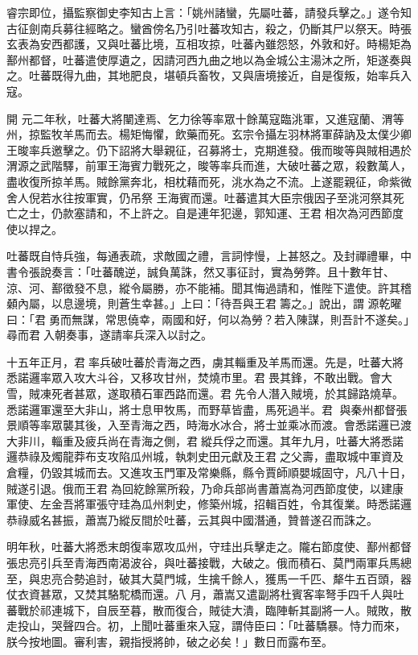 \begin{pinyinscope}
 睿宗即位，攝監察御史李知古上言：「姚州諸蠻，先屬吐蕃，請發兵擊之。」遂令知古征劍南兵募往經略之。蠻酋傍名乃引吐蕃攻知古，殺之，仍斷其尸以祭天。時張玄表為安西都護，又與吐蕃比境，互相攻掠，吐蕃內雖怨怒，外敦和好。時楊矩為鄯州都督，吐蕃遣使厚遺之，因請河西九曲之地以為金城公主湯沐之所，矩遂奏與之。吐蕃既得九曲，其地肥良，堪頓兵畜牧，又與唐境接近，自是復叛，始率兵入寇。



 開
 元二年秋，吐蕃大將闉達焉、乞力徐等率眾十餘萬寇臨洮軍，又進寇蘭、渭等州，掠監牧羊馬而去。楊矩悔懼，飲藥而死。玄宗令攝左羽林將軍薛訥及太僕少卿王晙率兵邀擊之。仍下詔將大舉親征，召募將士，克期進發。俄而晙等與賊相遇於渭源之武階驛，前軍王海賓力戰死之，晙等率兵而進，大破吐蕃之眾，殺數萬人，盡收復所掠羊馬。賊餘黨奔北，相枕藉而死，洮水為之不流。上遂罷親征，命紫微舍人倪若水往按軍實，仍吊祭
 王海賓而還。吐蕃遣其大臣宗俄因子至洮河祭其死亡之士，仍款塞請和，不上許之。自是連年犯邊，郭知運、王君相次為河西節度使以捍之。



 吐蕃既自恃兵強，每通表疏，求敵國之禮，言詞悖慢，上甚怒之。及封禪禮畢，中書令張說奏言：「吐蕃醜逆，誠負萬誅，然又事征討，實為勞弊。且十數年甘、涼、河、鄯徵發不息，縱令屬勝，亦不能補。聞其悔過請和，惟陛下遣使。許其稽顙內屬，以息邊境，則蒼生幸甚。」上曰：「待吾與王君籌之。」說出，謂
 源乾曜曰：「君勇而無謀，常思僥幸，兩國和好，何以為勞？若入陳謀，則吾計不遂矣。」尋而君入朝奏事，遂請率兵深入以討之。



 十五年正月，君率兵破吐蕃於青海之西，虜其輜重及羊馬而還。先是，吐蕃大將悉諾邏率眾入攻大斗谷，又移攻甘州，焚燒市里。君畏其鋒，不敢出戰。會大雪，賊凍死者甚眾，遂取積石軍西路而還。君先令人潛入賊境，於其歸路燒草。悉諾邏軍還至大非山，將士息甲牧馬，而野草皆盡，馬死過半。君
 與秦州都督張景順等率眾襲其後，入至青海之西，時海水冰合，將士並乘冰而渡。會悉諾邏已渡大非川，輜重及疲兵尚在青海之側，君縱兵俘之而還。其年九月，吐蕃大將悉諾邏恭祿及燭龍莽布支攻陷瓜州城，執刺史田元獻及王君之父壽，盡取城中軍資及倉糧，仍毀其城而去。又進攻玉門軍及常樂縣，縣令賈師順嬰城固守，凡八十日，賊遂引退。俄而王君為回紇餘黨所殺，乃命兵部尚書蕭嵩為河西節度使，以建康
 軍使、左金吾將軍張守珪為瓜州刺史，修築州城，招輯百姓，令其復業。時悉諾邏恭祿威名甚振，蕭嵩乃縱反間於吐蕃，云其與中國潛通，贊普遂召而誅之。



 明年秋，吐蕃大將悉末朗復率眾攻瓜州，守珪出兵擊走之。隴右節度使、鄯州都督張忠亮引兵至青海西南渴波谷，與吐蕃接戰，大破之。俄而積石、莫門兩軍兵馬總至，與忠亮合勢追討，破其大莫門城，生擒千餘人，獲馬一千匹、犛牛五百頭，器仗衣資甚眾，又焚其駱駝橋而還。八
 月，蕭嵩又遣副將杜賓客率弩手四千人與吐蕃戰於祁連城下，自辰至暮，散而復合，賊徒大潰，臨陣斬其副將一人。賊敗，散走投山，哭聲四合。初，上聞吐蕃重來入寇，謂侍臣曰：「吐蕃驕暴。恃力而來，朕今按地圖。審利害，親指授將帥，破之必矣！」數日而露布至。




\end{pinyinscope}
